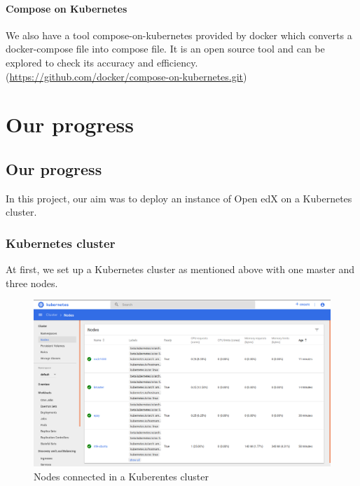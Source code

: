 \documentclass[12pt]{report}
\begin{document}
\subsubsection{Compose on Kubernetes}
We also have a tool compose-on-kubernetes provided by docker which converts a docker-compose file into compose file. It is an open source tool and can be explored to check its accuracy and efficiency.(\href{https://github.com/docker/compose-on-kubernetes.git}{https://github.com/docker/compose-on-kubernetes.git})
\chapter{Our progress}
\section{Our progress}
In this project, our aim was to deploy an instance of Open edX on a Kubernetes cluster.
\subsection{Kubernetes cluster}
At first, we set up a Kubernetes cluster as mentioned above with one master and three nodes.
\begin{figure}[h!]
	\begin{center}
		\includegraphics[totalheight=0.4\textheight]{cluster}
		\caption{Nodes connected in a Kuberentes cluster}
	\end{center}
\end{figure}
\\\\\\\\\\\\\\\\\\\\
\end{document}
